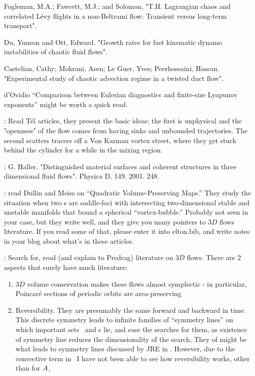 \documentclass[letter,10pt,openany]{article}
\begin{document}
\noindent
 Fogleman, M.A.; Fawcett, M.J.; and Solomon, "T.H.
Lagrangian chaos and correlated Lévy flights in a non-Beltrami flow:
Transient versus
long-term transport".

\noindent
 Du, Yunson and Ott, Edward.
"Growth rates for fast kinematic dynamo instabilities of chaotic
fluid flows".

\noindent
 Castelian, Cathy; Mokrani, Asen; Le Guer, Yves;
Peerhossaini, Hassan. "Experimental study of chaotic advection
regime in a twisted duct flow".


d'Ovidio \etal{}
     ``Comparison between Eulerian diagnostics and finite-size
    Lyapunov exponents''
    might be worth a quick read.

\medskip{}:
Read T\'{e}l articles,
they present the basic ideas: the first is
unphysical and the "openness" of the flow comes from having sinks and
unbounded trajectories.  The second scatters tracers off a Von Karman
vortex street, where they get stuck behind the cylinder for a while in
the mixing region.

\medskip{}:
G. Haller. "Distinguished material surfaces and coherent structures in three dimensional fluid flows". Physica D, 149. 2001. 248.


\medskip{}:
read
     {Dullin and Meiss} on ``Quadratic
Volume-Preserving Maps.'' They study the situation when two
\stagp s are saddle-foci with intersecting two-dimensional
stable and unstable manifolds that bound a spherical
``vortex-bubble.'' Probably not seen in your case, but they
write well, and they give you many pointers to $3D$ flows literature.
If you read some of that, please enter it into elton.bib, and
write notes in your blog about what's in these articles.

\medskip{}:
Search for, read (and explain to Predrag)
literature on $3D$ flows. There are 2 aspects that surely have much
literature:
    \begin{enumerate}
      \item
$3D$ volume conservation makes these flows
almost symplectic - in particular, Poincar\'e sections of periodic
orbits are area-preserving
      \item
Reversibility. They are presumably the same forward and
backward in time. This discrete symmetry leads to infinite families
of ``symmetry lines'' on which important sets \eqva\ and
\po s lie, and ease the searches for them, as existence of
symmetry line reduces the dimensionality of the search,
They of might be what
leads to symmetry lines discussed by JRE in .
However, due to the convective term in \NSe\ I have not been able to
see how reversibility works, other than for
{\velgradmat} $ {A} $,

    \end{enumerate}
\end{document}
